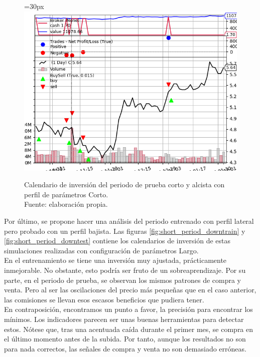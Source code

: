      	\begin{figure}[H]
     		\centering\leftskip=30px
     		\includegraphics[scale=0.70]{imagenes/S_Short_test.png}
     		\caption[Calendario de inversi\'on del periodo de prueba corto alcista]{Calendario de inversi\'on del periodo de prueba corto y alcista con perfil de par\'ametros Corto.\\ Fuente: elaboraci\'on propia.}
     		\label{fig:short_period_uptest}
     	\end{figure} 
     	
Por \'ultimo, se propone hacer una an\'alisis del periodo entrenado con perfil lateral pero probado con un perfil bajista. Las figuras \ref{fig:short_period_downtrain} y \ref{fig:short_period_downtest} contiene los calendarios de inversi\'on de estas simulaciones realizadas con configuraci\'on de par\'ametros Largo.\\

En el entrenamiento se tiene una inversi\'on muy ajustada, pr\'acticamente inmejorable. No obstante, esto podr\'ia ser fruto de un sobreaprendizaje. Por su parte, en el periodo de prueba, se observan los mismos patrones de compra y venta. Pero al ser las oscilaciones del precio m\'as peque\~nas que en el caso anterior, las comisiones se llevan esos escasos beneficios que pudiera tener.\\

En contraposici\'on, encontramos un punto a favor, la precisi\'on para encontrar los m\'inimos. Los indicadores parecen ser unas buenas herramientas para detectar estos. N\'otese que, tras una acentuada ca\'ida durante el primer mes, se compra en el \'ultimo momento antes de la subida. Por tanto, aunque los resultados no son para nada correctos, las se\~nales de compra y venta no son demasiado err\'oneas. \\
     	
